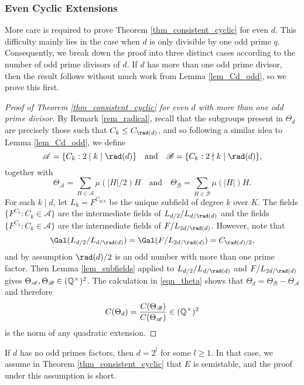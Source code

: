 \subsubsection{Even Cyclic Extensions}
More care is required to prove Theorem \ref{thm_consistent_cyclic} for even $d$. This difficulty mainly lies in the case when $d$ is only divisible by one odd prime $q$. Consequently, we break down the proof into three distinct cases according to the number of odd prime divisors of $d$. If $d$ has more than one odd prime divisor, then the result follows without much work from Lemma \ref{lem_Cd_odd}, so we prove this first.

\begin{proof}[Proof of Theorem \ref{thm_consistent_cyclic} for even $d$ with more than one odd prime divisor]
    By Remark \ref{rem_radical}, recall that the subgroups present in $\Theta_d$ are precisely those such that $C_k\leq C_{\rad(d)}$, and so following a similar idea to Lemma \ref{lem_Cd_odd}, we define
    $$\mathcal{A}=\{C_k :2\mid k\mid\rad(d)\}\quad\text{and}\quad\mathcal{B}=\{C_k:2\nmid k\mid\rad(d)\},$$
    together with
    $$\Theta_\mathcal{A}=\sum_{H\in\mathcal{A}}\mu(|H|/2)H\quad\text{and}\quad\Theta_\mathcal{B}=\sum_{H\in\mathcal{B}}\mu(|H|)H. $$ 
    For each $k\mid d$, let $L_k=F^{C_{d/k}}$ be the unique subfield of degree $k$ over $K$. The fields $\{F^{C_k}:C_k\in\mathcal{A}\}$ are the intermediate fields of $L_{d/2}/L_{d/\rad(d)}$ and the fields $\{F^{C_k}:C_k\in\mathcal{A}\}$ are the intermediate fields of $F/L_{2d/\rad(d)}$. However, note that 
    $$\Gal(L_{d/2}/L_{d/\rad(d)})=\Gal(F/L_{2d/\rad(d)})=C_{\rad(d)/2},$$
    and by assumption $\rad(d)/2$ is an odd number with more than one prime factor. Then Lemma \ref{lem_subfields} applied to $L_{d/2}/L_{d/\rad(d)}$ and $F/L_{2d/\rad(d)}$ gives $\Theta_\mathcal{A},\Theta_\mathcal{B}\in(\mathbb{Q}^{\times})^2$. The calculation in \eqref{eqn_theta} shows that $\Theta_d=\Theta_\mathcal{B}-\Theta_\mathcal{A}$ and therefore 
    $$C(\Theta_d)=\frac{C(\Theta_\mathcal{B})}{C(\Theta_\mathcal{A})}\in(\mathbb{Q}^{\times})^2$$
    is the norm of any quadratic extension.
\end{proof}

If $d$ has no odd primes factors, then $d=2^l$ for some $l\geq1$. In that case, we assume in Theorem \ref{thm_consistent_cyclic} that $E$ is semistable, and the proof under this assumption is short. 

